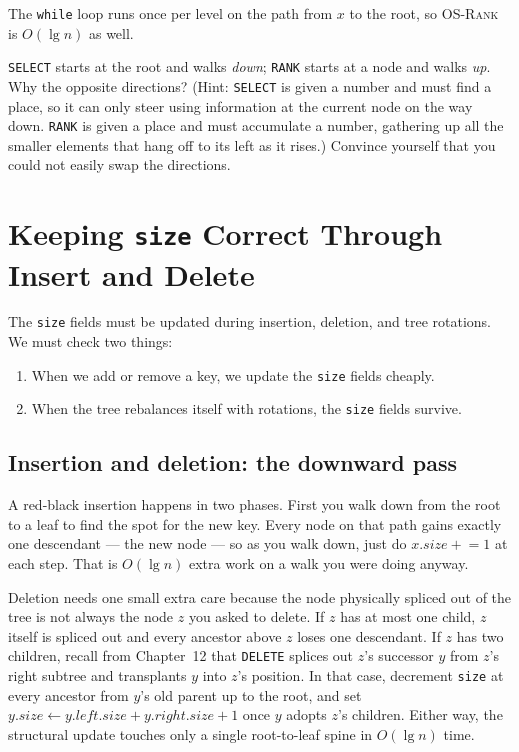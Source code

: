 The \texttt{while} loop runs once per level on the path from $x$ to the root, so
\textsc{OS-Rank} is $O(\lg n)$ as well.

\begin{walkbox}
\texttt{SELECT} starts at the root
and walks \emph{down}; \texttt{RANK} starts at a node and walks \emph{up}. Why
the opposite directions? (Hint: \texttt{SELECT} is given a number and must find
a place, so it can only steer using information at the current node on the way
down. \texttt{RANK} is given a place and must accumulate a number, gathering up
all the smaller elements that hang off to its left as it rises.) Convince
yourself that you could not easily swap the directions.
\end{walkbox}

\section{Keeping \texttt{size} Correct Through Insert and Delete}

The \texttt{size} fields must be updated during insertion, deletion, and tree rotations. We must check two things:

\begin{enumerate}
  \item When we add or remove a key, we update the \texttt{size} fields cheaply.
  \item When the tree rebalances itself with rotations, the \texttt{size} fields
    survive.
\end{enumerate}

\subsection{Insertion and deletion: the downward pass}

A red-black insertion happens in two phases. First you walk down from the root to
a leaf to find the spot for the new key. Every node on that path gains exactly
one descendant --- the new node --- so as you walk down, just do
$x.\mathit{size} \mathrel{+}= 1$ at each step. That is $O(\lg n)$ extra work on a
walk you were doing anyway.

Deletion needs one small extra care because the node physically spliced out of
the tree is not always the node $z$ you asked to delete. If $z$ has at most one
child, $z$ itself is spliced out and every ancestor above $z$ loses one
descendant. If $z$ has two children, recall from Chapter~12 that \texttt{DELETE}
splices out $z$'s successor $y$ from $z$'s right subtree and transplants $y$
into $z$'s position. In that case, decrement \texttt{size} at every ancestor
from $y$'s old parent up to the root, and set
$y.\mathit{size} \gets y.\mathit{left}.\mathit{size} + y.\mathit{right}.\mathit{size} + 1$
once $y$ adopts $z$'s children. Either way, the structural update touches
only a single root-to-leaf spine in $O(\lg n)$ time.


